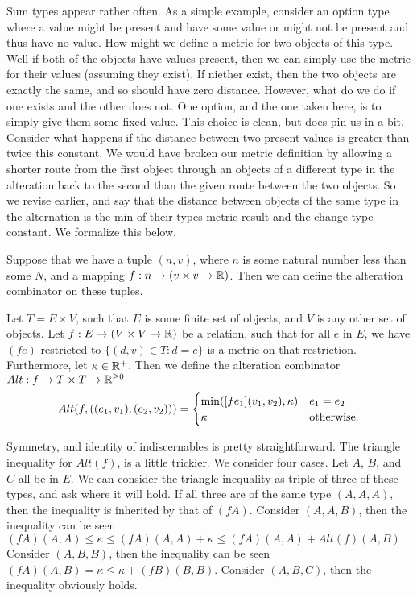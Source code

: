 Sum types appear rather often.
As a simple example, consider an option type where a value might be present and have some value 
or might not be present and thus have no value.
How might we define a metric for two objects of this type.
Well if both of the objects have values present, then we can simply use the metric for their values (assuming they exist).
If niether exist, then the two objects are exactly the same, and so should have zero distance.
However, what do we do if one exists and the other does not.
One option, and the one taken here, is to simply give them some fixed value.
This choice is clean, but does pin us in a bit.
Consider what happens if the distance between two present values is greater than twice this constant.
We would have broken our metric definition by allowing a shorter route from the first object through an objects of a different type in the alteration
back to the second than the given route between the two objects.
So we revise earlier, and say that the distance between objects of the same type in the alternation is the min of their types metric result 
and the change type constant. 
We formalize this below.

Suppose that we have a tuple $(n, v)$, where $n$ is some natural number less than some $N$,
and a mapping $f : n \to (v \times v \to \mathbb{R})$.
Then we can define the alteration combinator on these tuples.

\begin{definition}
Let $T = E \times V$, such that $E$ is some finite set of objects, and $V$ is any other set of objects.
Let $f : E \to (V \times V \to \mathbb{R})$ be a relation, such that for all $e$ in $E$, 
we have $(f e)$ restricted to $\{ (d, v) \in T : d = e \}$ is a metric on that restriction.
Furthermore, let $\kappa \in \mathbb{R}^{+}$.
Then we define the alteration combinator $Alt : f \to T \times T \to \mathbb{R}^{\ge 0}$
$$ Alt(f, ((e_1, v_1), (e_2, v_2))) = \begin{cases}
    \min( [f e_1](v_1, v_2), \kappa) & e_1 = e_2 \\ 
    \kappa & \text{otherwise.}
\end{cases}$$
\end{definition}

Symmetry, and identity of indiscernables is pretty straightforward.
The triangle inequality for $Alt(f)$, is a little trickier.
We consider four cases. 
Let $A$, $B$, and $C$ all be in $E$.
We can consider the triangle inequality as triple of three of these types,
and ask where it will hold. 
If all three are of the same type $(A, A, A)$, then the inequality is inherited by that of $(f A)$.
Consider $(A, A, B)$, then the inequality can be seen $(f A)(A, A) \le \kappa \le (f A)(A, A) + \kappa \le (f A)(A, A) + Alt(f)(A, B)$
Consider $(A, B, B)$, then the inequality can be seen $(f A)(A, B) = \kappa \le \kappa + (f B)(B, B)$.
Consider $(A, B, C)$, then the inequality obviously holds.
